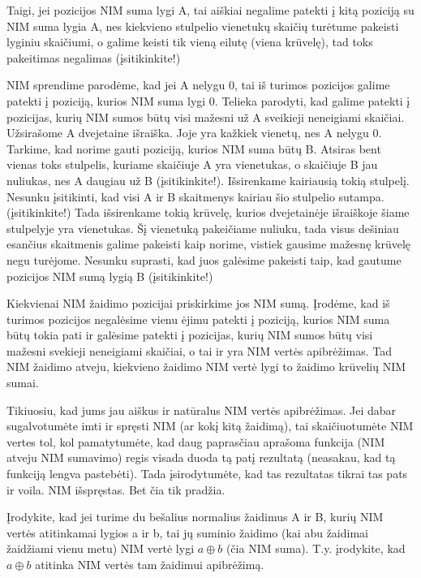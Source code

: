 Taigi, jei pozicijos NIM suma lygi A, tai aiškiai negalime patekti į kitą
poziciją su NIM suma lygia A, nes kiekvieno stulpelio vienetukų skaičių
turėtume pakeisti lyginiu skaičiumi, o galime keisti tik vieną eilutę (viena
krūvelę), tad toks pakeitimas negalimas (įsitikinkite!)

NIM sprendime parodėme, kad jei A nelygu 0, tai iš turimos pozicijos galime
patekti į poziciją, kurios NIM suma lygi 0. Telieka parodyti, kad galime
patekti į pozicijas, kurių NIM sumos būtų visi mažesni už A sveikieji
neneigiami skaičiai. Užsirašome A dvejetaine išraiška. Joje yra kažkiek
vienetų, nes A nelygu 0. Tarkime, kad norime gauti poziciją, kurios NIM suma
būtų B. Atsiras bent vienas toks stulpelis, kuriame skaičiuje A yra vienetukas,
o skaičiuje B jau nuliukas, nes A daugiau už B (įsitikinkite!). Išsirenkame
kairiausią tokią stulpelį. Nesunku įsitikinti, kad visi A ir B skaitmenys
kairiau šio stulpelio sutampa. (įsitikinkite!) Tada išsirenkame tokią krūvelę,
kurios dvejetainėje išraiškoje šiame stulpelyje yra vienetukas. Šį vienetuką
pakeičiame nuliuku, tada visus dešiniau esančius skaitmenis galime pakeisti
kaip norime, vistiek gausime mažesnę krūvelę negu turėjome. Nesunku suprasti,
kad juos galėsime pakeisti taip, kad gautume pozicijos NIM sumą lygią B
(įsitikinkite!)

Kiekvienai NIM žaidimo pozicijai priskirkime jos NIM sumą. Įrodėme, kad iš
turimos pozicijos negalėsime vienu ėjimu patekti į poziciją, kurios NIM suma
būtų tokia pati ir galėsime patekti į pozicijas, kurių NIM sumos būtų visi
mažesni svekieji neneigiami skaičiai, o tai ir yra NIM vertės apibrėžimas. Tad
NIM žaidimo atveju, kiekvieno žaidimo NIM vertė lygi to žaidimo krūvelių NIM
sumai.

Tikiuosiu, kad jums jau aiškus ir natūralus NIM vertės apibrėžimas. Jei dabar
sugalvotumėte imti ir spręsti NIM (ar kokį kitą žaidimą), tai skaičiuotumėte
NIM vertes tol, kol pamatytumėte, kad daug paprasčiau aprašoma funkcija (NIM
atveju NIM sumavimo) regis visada duoda tą patį rezultatą (neasakau, kad tą
funkciją lengva pastebėti). Tada įsirodytumėte, kad tas rezultatas tikrai tas
pats ir voila. NIM išspręstas. Bet čia tik pradžia.

\begin{pavnr}
  Įrodykite, kad jei turime du bešalius normalius žaidimus A ir B, kurių NIM
  vertės atitinkamai lygios a ir b, tai jų suminio žaidimo (kai abu žaidimai
  žaidžiami vienu metu) NIM vertė lygi  $a\oplus b$ (čia NIM suma). T.y.
  įrodykite, kad  $a\oplus b$ atitinka NIM vertės tam žaidimui apibrėžimą.
\end{pavnr}

